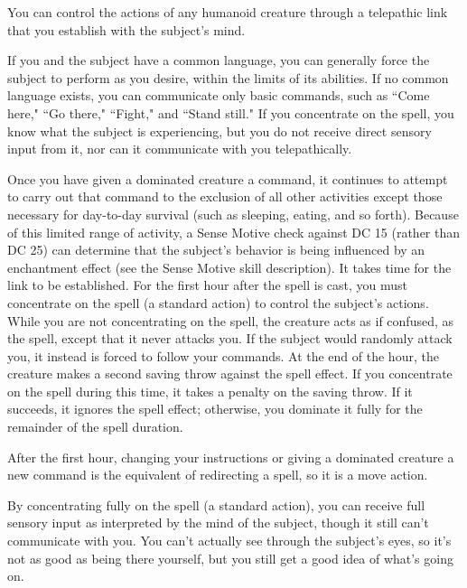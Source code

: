 \spellrng{\rngclose}
\begin{spelleffect}
  You can control the actions of any humanoid creature through a telepathic link that you establish with the subject's mind.
  \par If you and the subject have a common language, you can generally force the subject to perform as you desire, within the limits of its abilities. If no common language exists, you can communicate only basic commands, such as ``Come here," ``Go there," ``Fight," and ``Stand still." If you concentrate on the spell, you know what the subject is experiencing, but you do not receive direct sensory input from it, nor can it communicate with you telepathically.
  \par Once you have given a dominated creature a command, it continues to attempt to carry out that command to the exclusion of all other activities except those necessary for day-to-day survival (such as sleeping, eating, and so forth). Because of this limited range of activity, a Sense Motive check against DC 15 (rather than DC 25) can determine that the subject's behavior is being influenced by an enchantment effect (see the Sense Motive skill description).
  It takes time for the link to be established. For the first hour after the spell is cast, you must concentrate on the spell (a standard action) to control the subject's actions. While you are not concentrating on the spell, the creature acts as if confused, as the  spell, except that it never attacks you. If the subject would randomly attack you, it instead is forced to follow your commands. At the end of the hour, the creature makes a second saving throw against the spell effect. If you concentrate on the spell during this time, it takes a  penalty on the saving throw. If it succeeds, it ignores the spell effect; otherwise, you dominate it fully for the remainder of the spell duration.
  \par After the first hour, changing your instructions or giving a dominated creature a new command is the equivalent of redirecting a spell, so it is a move action.
  \par By concentrating fully on the spell (a standard action), you can receive full sensory input as interpreted by the mind of the subject, though it still can't communicate with you. You can't actually see through the subject's eyes, so it's not as good as being there yourself, but you still get a good idea of what's going on.

\end{spelleffect}
